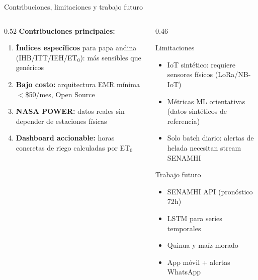 \documentclass[14pt,aspectratio=169]{beamer}
\begin{document}
\begin{frame}{Contribuciones, limitaciones y trabajo futuro}
  \begin{columns}[T]
    \begin{column}{0.52\textwidth}
      \textbf{\textcolor{agrolight}{Contribuciones principales:}}
      \vspace{0.2em}
      \begin{enumerate}\small
        \item \textbf{\'Indices espec\'ificos} para papa andina
          (IHB/ITT/IEH/ET$_0$): m\'as sensibles que gen\'ericos
        \item \textbf{Bajo costo:} arquitectura EMR m\'inima
          $<$\$50/mes, Open Source
        \item \textbf{NASA POWER:} datos reales sin depender
          de estaciones f\'isicas
        \item \textbf{Dashboard accionable:} horas concretas
          de riego calculadas por ET$_0$
      \end{enumerate}
    \end{column}

    \begin{column}{0.46\textwidth}
      \begin{alertblock}{Limitaciones}
        \begin{itemize}\footnotesize
          \item IoT sint\'etico: requiere sensores
            f\'isicos (LoRa/NB-IoT)
          \item M\'etricas ML orientativas (datos
            sint\'eticos de referencia)
          \item Solo batch diario: alertas de
            helada necesitan stream SENAMHI
        \end{itemize}
      \end{alertblock}
      \vspace{0.3em}
      \begin{exampleblock}{Trabajo futuro}
        \begin{itemize}\footnotesize
          \item SENAMHI API (pron\'ostico 72h)
          \item LSTM para series temporales
          \item Quinua y ma\'iz morado
          \item App m\'ovil + alertas WhatsApp
        \end{itemize}
      \end{exampleblock}
    \end{column}
  \end{columns}
\end{frame}
\end{document}
